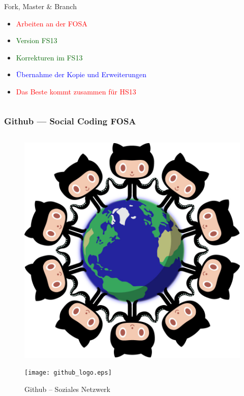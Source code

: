 \begin{frame}
\begin{columns}
\begin{column}{5cm}
\begin{block}{Fork, Master \& Branch}
\begin{itemize}
					\item \textcolor{red}{Arbeiten an der FOSA}
					\item \textcolor{darkgreen}{Version FS13}
					\item \textcolor{darkgreen}{Korrekturen im FS13}
					\item \textcolor{blue}{Übernahme der Kopie und Erweiterungen}
		                        \item \textcolor{red}{Das Beste kommt zusammen für HS13}
				\end{itemize}
			\end{block}
		\end{column}
	\end{columns}
\end{frame}


\begin{frame}
	\frametitle{Github --- Social Coding \hfill{} \footnotesize{FOSA}}
	\begin{columns}
	        \begin{column}{5cm}
			\begin{figure}
				\centering
				\includegraphics[scale=0.08]{github_network.jpg}
			\end{figure}
				\vfill{}
			\begin{figure}
				\centering
				\texttt{[image: github\_logo.eps]}
				\caption{Github -- Soziales Netzwerk}

\end{figure}
\end{column}
\end{columns}
\end{frame}
